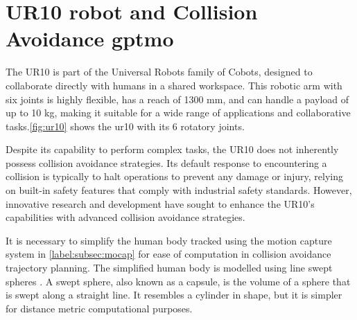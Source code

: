 \section{UR10 robot and Collision Avoidance \gls{gptmo}}
The UR10 is part of the Universal Robots family of \gls{Cobots}, designed to collaborate directly with humans in a shared workspace. This robotic arm with six joints is highly flexible, has a reach of 1300 mm, and can handle a payload of up to 10 kg, making it suitable for a wide range of applications and collaborative tasks.\autoref{fig:ur10} shows the ur10 with its 6 rotatory joints.

Despite its capability to perform complex tasks, the UR10 does not inherently possess collision avoidance strategies. Its default response to encountering a collision is typically to halt operations to prevent any damage or injury, relying on built-in safety features that comply with industrial safety standards. However, innovative research and development have sought to enhance the UR10's capabilities with advanced collision avoidance strategies.

It is necessary to simplify the human body tracked using the motion capture system in \autoref{label:subsec:mocap}  for ease of computation in collision avoidance trajectory planning. The simplified human body is modelled using line swept spheres \parencite{larsen}. A swept sphere, also known as a capsule, is the volume of a sphere that is swept along a straight line. It resembles a cylinder in shape, but it is simpler for distance metric computational purposes. 

